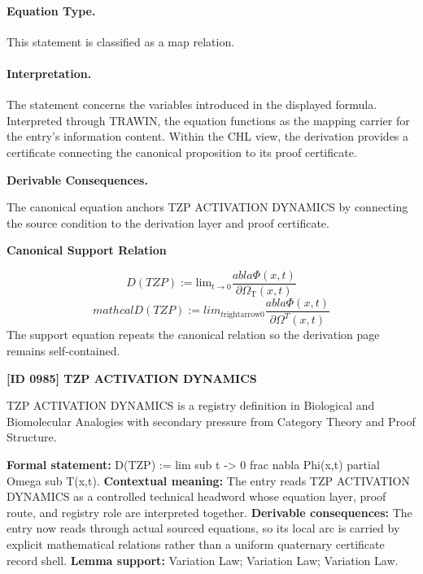 \paragraph{Equation Type.}
This statement is classified as a map relation.

\paragraph{Interpretation.}
The statement concerns the variables introduced in the displayed formula. Interpreted through TRAWIN, the equation functions as the mapping carrier for the entry’s information content. Within the CHL view, the derivation provides a certificate connecting the canonical proposition to its proof certificate.

\par\vspace{0.35em}
\noindent\textbf{Derivable Consequences.}\quad
\begingroup
\footnotesize
\raggedright
The canonical equation anchors TZP ACTIVATION DYNAMICS by connecting the source condition to the derivation layer and proof certificate.
\par\endgroup

\noindent\textbf{Canonical Support Relation}\par
\[
D(TZP) := \mathrm{lim}_{t \to 0} \frac{ abla \Phi(x,t)}{\partial \Omega_{\mathrm{T}}(x,t)}
\]
\[
mathcal{D}(TZP):=lim_{t\mathrm{rightarrow}0}\frac{ abla\Phi(x,t)}{\partial\Omega^{T}(x,t)}
\]
\noindent The support equation repeats the canonical relation so the derivation page remains self-contained.\par

\clearpage
\noindent\textbf{[ID 0985] TZP ACTIVATION DYNAMICS}\par
\vspace{0.35em}
\begingroup\small
{}
TZP ACTIVATION DYNAMICS is a registry definition in Biological and Biomolecular Analogies with secondary pressure from Category Theory and Proof Structure.

\begingroup\footnotesize\setlength{\emergencystretch}{3em}\sloppy
\textbf{Formal statement:} D(TZP) := lim sub t -> 0 frac nabla Phi(x,t) partial Omega sub T(x,t). \textbf{Contextual meaning:} The entry reads TZP ACTIVATION DYNAMICS as a controlled technical headword whose equation layer, proof route, and registry role are interpreted together. \textbf{Derivable consequences:} The entry now reads through actual sourced equations, so its local arc is carried by explicit mathematical relations rather than a uniform quaternary certificate record shell. \textbf{Lemma support:} Variation Law; Variation Law; Variation Law.\par
\endgroup


